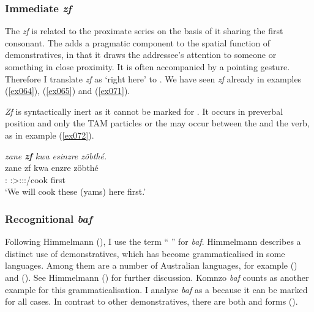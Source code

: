 \subsubsection{Immediate \emph{zf}} \label{immediate-demonstrative-subsec}

The   \emph{zf} is related to the proximate series on the basis of it sharing the first consonant. The  adds a pragmatic component to the spatial function of demonstratives, in that it draws the addressee's attention to someone or something in close proximity. It is often accompanied by a pointing gesture. Therefore I translate \emph{zf} as `right here' to . We have seen \emph{zf} already in examples (\ref{ex064}), (\ref{ex065}) and (\ref{ex071}).

\emph{Zf} is syntactically inert as it cannot be marked for . It occurs in preverbal position and only the TAM particles or the  may occur between the   and the verb, as in example (\ref{ex072}).

\begin{exe}
	\ex \emph{zane \textbf{zf} kwa esinzre zöbthé.}\\
	\gll zane zf kwa enzre zöbthé\\
	{\Dem}:{\Prox} {\Imm} {\Fut} \Fpl:\Sbj>\Stpl:\Obj:\Nonpast:\Ipfv/cook first\\
	\trans `We will cook these (yams) here first.' 
	\label{ex072}
\end{exe}

\subsubsection{Recognitional \emph{baf}} \label{recognitional-pronoun-subsec}

Following Himmelmann (\citeyear{Himmelmann:1996tp}), I use the term `` '' for \textit{baf}. Himmelmann describes a distinct  use of demonstratives, which has become grammaticalised in some languages. Among them are a number of Australian languages, for example  (\citealt{Heath:1984uk}) and  (\citealt{Goddard:1985tw}). See Himmelmann (\citeyear[231ff.]{Himmelmann:1996tp}) for further discussion. Komnzo \emph{baf} counts as another example for this grammaticalisation. I analyse \emph{baf} as a  because it can be marked for all cases. In contrast to other demonstratives, there are both  and  forms ().


